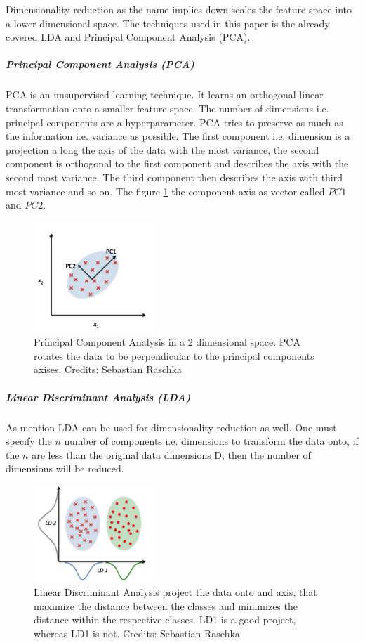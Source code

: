Dimensionality reduction as the name implies down scales the feature space into a lower dimensional space. The techniques used in this paper is the already covered LDA and Principal Component Analysis (PCA).

\subparagraph{Principal Component Analysis (PCA)}

PCA is an unsupervised learning technique. It learns an orthogonal linear transformation onto a smaller feature space. The number of dimensions i.e. principal components are a hyperparameter. PCA tries to preserve as much as the information i.e. variance as possible. The first component i.e. dimension is a projection a long the axis of the data with the most variance, the second component is orthogonal to the first component and describes the axis with the second most variance. The third component then describes the axis with third most variance and so on. The figure \ref{fig:pca} the component axis as vector called $PC1$ and $PC2$.

\begin{figure}[H]
    \centering
    \includegraphics[width=0.4\textwidth]{figures/pca.png}
    \caption[]{Principal Component Analysis in a 2 dimensional space. PCA rotates the data to be perpendicular to the principal components axises. Credits: Sebastian Raschka}
    \label{fig:pca}
\end{figure}

\subparagraph{Linear Discriminant Analysis (LDA)}
As mention LDA can be used for dimensionality reduction as well. One must specify the $n$ number of components i.e. dimensions to transform the data onto, if the $n$ are less than the original data dimensions D, then the number of dimensions will be reduced. 

\begin{figure}[H]
    \centering
    \includegraphics[width=0.4\textwidth]{figures/lda.png}
    \caption[]{Linear Discriminant Analysis project the data onto and axis, that maximize the distance between the classes and minimizes the distance within the respective classes. LD1 is a good project, whereas LD1 is not. Credits: Sebastian Raschka}
    \label{fig:lda}
\end{figure}

